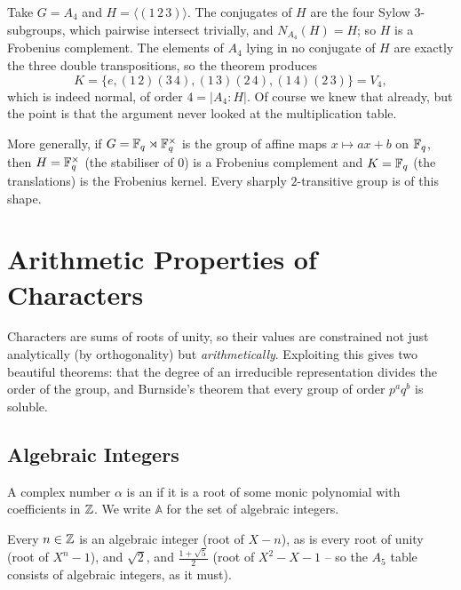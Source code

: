 \documentclass[a4paper]{scrartcl}
\newcommand{\gen}[1]{\langle #1 \rangle}
\begin{document}
\begin{example}
	Take $G = A_4$ and $H = \gen{(1\,2\,3)}$. The conjugates of $H$ are the four Sylow $3$-subgroups, which pairwise intersect trivially, and $N_{A_4}(H) = H$; so $H$ is a Frobenius complement. The elements of $A_4$ lying in no conjugate of $H$ are exactly the three double transpositions, so the theorem produces
	$$K = \{e, (1\,2)(3\,4),(1\,3)(2\,4),(1\,4)(2\,3)\} = V_4,$$
	which is indeed normal, of order $4 = |A_4:H|$. Of course we knew that already, but the point is that the argument never looked at the multiplication table.
\end{example}

\begin{example}
	More generally, if $G = \mathbb{F}_q\rtimes\mathbb{F}_q^\times$ is the group of affine maps $x\mapsto ax+b$ on $\mathbb{F}_q$, then $H = \mathbb{F}_q^\times$ (the stabiliser of $0$) is a Frobenius complement and $K = \mathbb{F}_q$ (the translations) is the Frobenius kernel. Every sharply $2$-transitive group is of this shape.
\end{example}

\section{Arithmetic Properties of Characters}

Characters are sums of roots of unity, so their values are constrained not just analytically (by orthogonality) but \emph{arithmetically}. Exploiting this gives two beautiful theorems: that the degree of an irreducible representation divides the order of the group, and Burnside's theorem that every group of order $p^aq^b$ is soluble.

\subsection{Algebraic Integers}

\begin{definition}
	A complex number $\alpha$ is an  if it is a root of some monic polynomial with coefficients in $\mathbb{Z}$. We write $\mathbb{A}$ for the set of algebraic integers.
\end{definition}

\begin{example}
	Every $n\in\mathbb{Z}$ is an algebraic integer (root of $X - n$), as is every root of unity (root of $X^n - 1$), and $\sqrt 2$, and $\frac{1+\sqrt5}{2}$ (root of $X^2 - X - 1$ -- so the $A_5$ table consists of algebraic integers, as it must).
\end{example}
\end{document}
